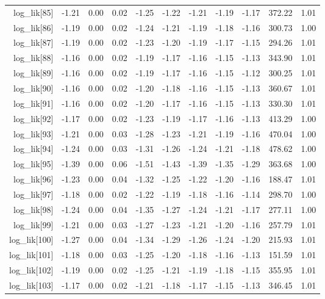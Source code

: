 \begin{table}[ht]
\begin{tabular}{rrrrrrrrrrr}
  log\_lik[85] & -1.21 & 0.00 & 0.02 & -1.25 & -1.22 & -1.21 & -1.19 & -1.17 & 372.22 & 1.01 \\ 
  log\_lik[86] & -1.19 & 0.00 & 0.02 & -1.24 & -1.21 & -1.19 & -1.18 & -1.16 & 300.73 & 1.00 \\ 
  log\_lik[87] & -1.19 & 0.00 & 0.02 & -1.23 & -1.20 & -1.19 & -1.17 & -1.15 & 294.26 & 1.01 \\ 
  log\_lik[88] & -1.16 & 0.00 & 0.02 & -1.19 & -1.17 & -1.16 & -1.15 & -1.13 & 343.90 & 1.01 \\ 
  log\_lik[89] & -1.16 & 0.00 & 0.02 & -1.19 & -1.17 & -1.16 & -1.15 & -1.12 & 300.25 & 1.01 \\ 
  log\_lik[90] & -1.16 & 0.00 & 0.02 & -1.20 & -1.18 & -1.16 & -1.15 & -1.13 & 360.67 & 1.01 \\ 
  log\_lik[91] & -1.16 & 0.00 & 0.02 & -1.20 & -1.17 & -1.16 & -1.15 & -1.13 & 330.30 & 1.01 \\ 
  log\_lik[92] & -1.17 & 0.00 & 0.02 & -1.23 & -1.19 & -1.17 & -1.16 & -1.13 & 413.29 & 1.00 \\ 
  log\_lik[93] & -1.21 & 0.00 & 0.03 & -1.28 & -1.23 & -1.21 & -1.19 & -1.16 & 470.04 & 1.00 \\ 
  log\_lik[94] & -1.24 & 0.00 & 0.03 & -1.31 & -1.26 & -1.24 & -1.21 & -1.18 & 478.62 & 1.00 \\ 
  log\_lik[95] & -1.39 & 0.00 & 0.06 & -1.51 & -1.43 & -1.39 & -1.35 & -1.29 & 363.68 & 1.00 \\ 
  log\_lik[96] & -1.23 & 0.00 & 0.04 & -1.32 & -1.25 & -1.22 & -1.20 & -1.16 & 188.47 & 1.01 \\ 
  log\_lik[97] & -1.18 & 0.00 & 0.02 & -1.22 & -1.19 & -1.18 & -1.16 & -1.14 & 298.70 & 1.00 \\ 
  log\_lik[98] & -1.24 & 0.00 & 0.04 & -1.35 & -1.27 & -1.24 & -1.21 & -1.17 & 277.11 & 1.00 \\ 
  log\_lik[99] & -1.21 & 0.00 & 0.03 & -1.27 & -1.23 & -1.21 & -1.20 & -1.16 & 257.79 & 1.01 \\ 
  log\_lik[100] & -1.27 & 0.00 & 0.04 & -1.34 & -1.29 & -1.26 & -1.24 & -1.20 & 215.93 & 1.01 \\ 
  log\_lik[101] & -1.18 & 0.00 & 0.03 & -1.25 & -1.20 & -1.18 & -1.16 & -1.13 & 151.59 & 1.01 \\ 
  log\_lik[102] & -1.19 & 0.00 & 0.02 & -1.25 & -1.21 & -1.19 & -1.18 & -1.15 & 355.95 & 1.01 \\ 
  log\_lik[103] & -1.17 & 0.00 & 0.02 & -1.21 & -1.18 & -1.17 & -1.15 & -1.13 & 346.45 & 1.01 \\ 

\end{tabular}
\end{table}
